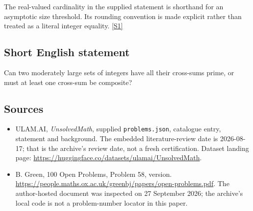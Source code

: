 \documentclass[11pt,a4paper]{article}
\newcommand{\sref}[2]{\hyperlink{source:#1:#2}{[S#2]}}
\begin{document}
The real-valued cardinality in the supplied statement is shorthand for an asymptotic size threshold. Its rounding convention is made explicit rather than treated as a literal integer equality. \sref{statement}{1}

\subsection{Short English statement}

Can two moderately large sets of integers have all their cross-sums prime, or must at least one cross-sum be composite?

\subsection{Sources}

{\small

\begin{itemize}

\item[\hypertarget{source:statement:1}{S1}] ULAM.AI, \emph{UnsolvedMath}, supplied \texttt{problems.json}, catalogue entry, statement and background. The embedded literature-review date is 2026-08-17; that is the archive’s review date, not a fresh certification. Dataset landing page: \url{https://huggingface.co/datasets/ulamai/UnsolvedMath}.

\item[\hypertarget{source:statement:2}{S2}] B. Green, 100 Open Problems, Problem 58, version. \url{https://people.maths.ox.ac.uk/greenbj/papers/open-problems.pdf}. The author-hosted document was inspected on 27 September 2026; the archive’s local code is not a problem-number locator in this paper.

\end{itemize}

}

\label{end:statement}
\end{document}
